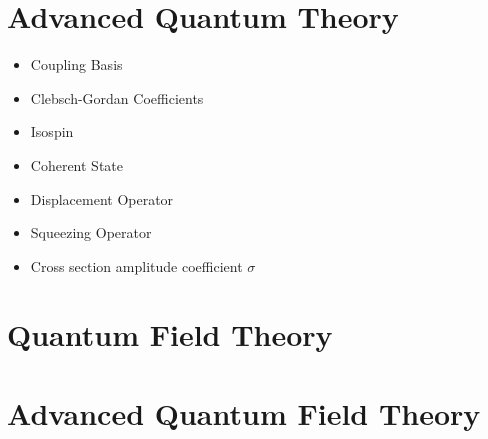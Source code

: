 \documentclass[10pt]{article}
\begin{document}
\section{Advanced Quantum Theory}
\begin{itemize}
	\item Coupling Basis
	\item Clebsch-Gordan Coefficients
	\item Isospin
	\item Coherent State
	\item Displacement Operator
	\item Squeezing Operator
	\item Cross section amplitude coefficient $\sigma$
\end{itemize}
\section{Quantum Field Theory}
\section{Advanced Quantum Field Theory}
\end{document}
